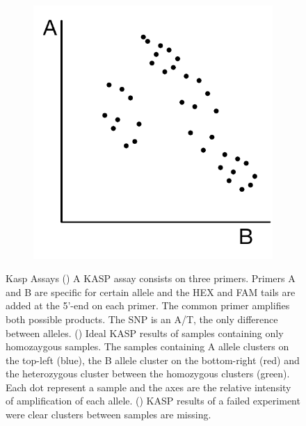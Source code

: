 \begin{figure}
\begin{subfigure}{0.45\textwidth}
    \includegraphics[width=1\textwidth]{PolyMarker/Figures/intro/kaspFail.pdf}
    \end{subfigure}

\caption{Kasp Assays () A KASP assay consists on three primers. Primers A and B are specific for certain allele and the HEX and FAM tails are added at the 5'-end on each primer. The common primer amplifies both possible products. The SNP is an A/T, the only difference between alleles. () Ideal KASP results of samples containing only homozaygous samples. The samples containing  A allele clusters on the top-left (blue), the B allele cluster on the bottom-right (red) and the heterozygous cluster between the homozygous clusters (green). Each dot represent a sample and the axes are the relative intensity of amplification of each allele. () KASP results of a failed experiment were clear clusters between samples are missing. }
\end{figure}


